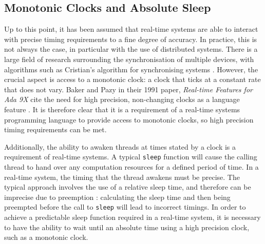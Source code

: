\subsection{Monotonic Clocks and Absolute Sleep}
Up to this point, it has been assumed that real-time systems are able to
interact with precise timing requirements to a fine degree of accuracy.  
In practice, this is not always the case, in particular with the use
of distributed systems. There is a large field of research surrounding the
synchronisation of multiple devices, with algorithms such as Cristian's
algorithm for synchronising systems \cite{37958}. However, the crucial aspect is 
access to a monotonic clock: a clock that ticks at a constant rate that does
not vary. Baker and Pazy in their 1991 paper,\emph{ Real-time Features for Ada 9X} 
cite the need for high precision, non-changing clocks as a language feature \cite{160371}.  
It is therefore clear that it is a requirement of a real-time systems
programming language to provide access to monotonic clocks, so high
precision timing requirements can be met.  
\par\bigskip\noindent
Additionally,
the ability to awaken threads at times stated by a clock is a requirement of
real-time systems. A typical \texttt{sleep} function will cause the calling
thread to hand over any computation resources for a defined period of time.  In
a real-time system, the timing that the thread awakens must be precise.  The
typical approach involves the use of a relative sleep time, and therefore can
be imprecise due to preemption \cite{real-time-systems}: calculating the sleep
time and then being preempted before the call to \texttt{sleep} will lead to
incorrect timings. In order to achieve a predictable sleep function
required in a real-time system, it is necessary to have the ability to wait
until an absolute time using a high precision clock, such as a monotonic
clock.

